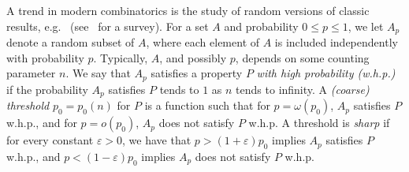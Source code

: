 \documentclass[12pt]{article}
\newcommand{\ep}{\varepsilon}
\begin{document}
A trend in modern combinatorics is the study of random versions of classic results, e.g.~\cite{BMS,CG,ST,Scha} (see~\cite{RandomExtremal} for a survey). For a set $A$ and probability $0 \leq p \leq 1$, we let $A_p$ denote a random subset of $A$, where each element of $A$ is included independently with probability $p$. Typically, $A$, and possibly $p$, depends on some counting parameter $n$. We say that $A_p$ satisfies a property $P$ \emph{with high probability (w.h.p.)} if the probability $A_p$ satisfies $P$ tends to $1$ as $n$ tends to infinity. A \emph{(coarse) threshold} $p_0 = p_0(n)$ for $P$ is a function such that for $p = \omega(p_0)$, $A_p$ satisfies $P$ w.h.p., and for $p = o(p_0)$, $A_p$ does not satisfy $P$ w.h.p. A threshold is \emph{sharp} if for every constant $\ep>0$, we have that $p>(1+\ep)p_0$ implies $A_p$ satisfies $P$ w.h.p., and $p<(1-\ep)p_0$ implies $A_p$ does not satisfy $P$ w.h.p.
\end{document}
